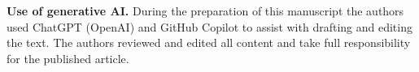 \documentclass[pdflatex,sn-basic]{sn-jnl}
\theoremstyle{thmstyleone}
\theoremstyle{thmstyletwo}
\theoremstyle{thmstylethree}
\begin{document}
\textbf{Use of generative AI.} During the preparation of this manuscript the authors used ChatGPT (OpenAI) and GitHub Copilot to assist with drafting and editing the text. The authors reviewed and edited all content and take full responsibility for the published article.


\end{document}

